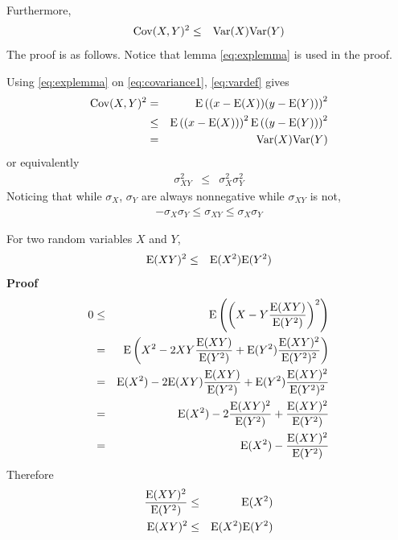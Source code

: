 Furthermore,
\begin{eqnarray}
  \textup{Cov}(X, Y)^2 &\leq& \textup{Var}(X)\textup{Var}(Y) \nonumber
\end{eqnarray}
The proof is as follows. Notice that lemma \eqref{eq:explemma} is used in the proof.

Using \eqref{eq:explemma} on \eqref{eq:covariance1}, \eqref{eq:vardef} gives
\begin{eqnarray}
	\textup{Cov}(X, Y)^2 &=& \textup{E}\left((x - \textup{E}(X))(y - \textup{E}(Y))\right)^2 \nonumber \\
	&\leq& \textup{E}\left((x - \textup{E}(X))\right)^2\textup{E}\left((y - \textup{E}(Y))\right)^2 \nonumber \\
	&=& \textup{Var}(X)\textup{Var}(Y) \nonumber
\end{eqnarray}
or equivalently
\begin{eqnarray}
	\sigma_{XY}^2 &\leq& \sigma_X^2\sigma_Y^2 \nonumber
\end{eqnarray}
Noticing that while $\sigma_X$, $\sigma_Y$ are always nonnegative while $\sigma_{XY}$ is not,
\begin{eqnarray}
	-\sigma_X\sigma_Y \leq \sigma_{XY} \leq \sigma_X\sigma_Y \label{eq:covlemma}
\end{eqnarray}

\begin{shortbox}

For two random variables $X$ and $Y$,
\begin{eqnarray}
  \textup{E}(XY)^2 &\leq&  \textup{E}(X^2)\textup{E}(Y^2) \label{eq:explemma}
\end{eqnarray}
\textbf{Proof}
\begin{eqnarray}
  0 &\leq& \textup{E}\left(\left(X-Y\dfrac{\textup{E}(XY)}{\textup{E}(Y^2)}\right)^2\right) \nonumber \\
  &=& \textup{E}\left(X^2-2XY\dfrac{\textup{E}(XY)}{\textup{E}(Y^2)}+\textup{E}(Y^2)\dfrac{\textup{E}(XY)^2}{\textup{E}(Y^2)^2}\right) \nonumber \\
  &=& \textup{E}(X^2) - 2\textup{E}(XY)\dfrac{\textup{E}(XY)}{\textup{E}(Y^2)} + \textup{E}(Y^2)\dfrac{\textup{E}(XY)^2}{\textup{E}(Y^2)^2} \nonumber \\
  &=& \textup{E}(X^2) - 2\dfrac{\textup{E}(XY)^2}{\textup{E}(Y^2)} + \dfrac{\textup{E}(XY)^2}{\textup{E}(Y^2)} \nonumber \\
  &=& \textup{E}(X^2) - \dfrac{\textup{E}(XY)^2}{\textup{E}(Y^2)} \nonumber
\end{eqnarray}
Therefore
\begin{eqnarray}
  \dfrac{\textup{E}(XY)^2}{\textup{E}(Y^2)} &\leq& \textup{E}(X^2) \nonumber \\
  \textup{E}(XY)^2 &\leq&  \textup{E}(X^2)\textup{E}(Y^2) \nonumber
\end{eqnarray}
\end{shortbox}

